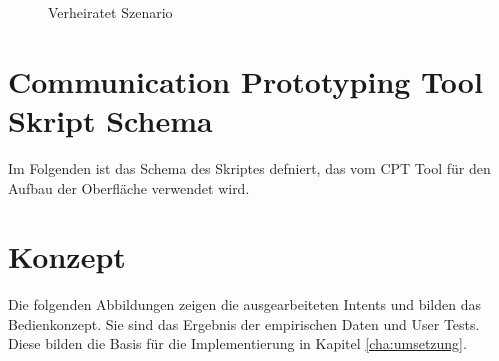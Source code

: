 \begin{figure}[!htb]
    \centering
    \caption{Verheiratet Szenario}
    \label{fig:szenario-verheiratet}
\end{figure}

\section{Communication Prototyping Tool Skript Schema}
\label{sec:cpt-input-schema}

Im Folgenden ist das Schema des Skriptes defniert, das vom CPT Tool für den Aufbau der Oberfläche verwendet wird.



\section{Konzept}
\label{sec:anhang-konzept}
Die folgenden Abbildungen zeigen die ausgearbeiteten Intents und bilden das Bedienkonzept. Sie sind das Ergebnis der empirischen Daten und User Tests. Diese bilden die Basis für die Implementierung in Kapitel \ref{cha:umsetzung}.

